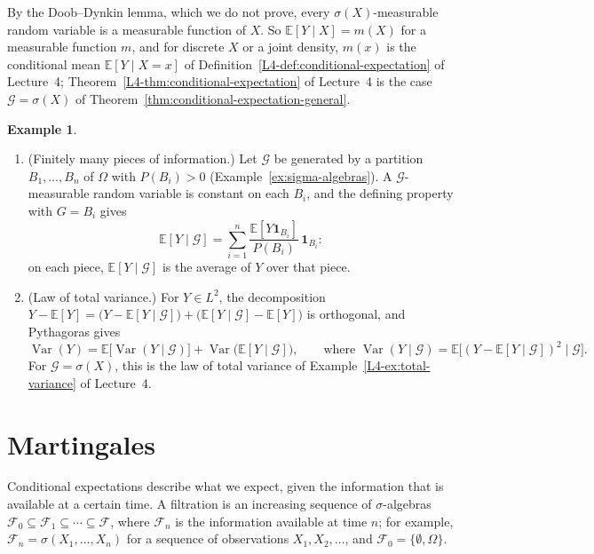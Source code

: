 \documentclass[11pt]{article}
\newcommand{\E}{\mathbb{E}}
\DeclareMathOperator{\Var}{Var}
\theoremstyle{definition}
\newtheorem{example}[definition]{Example}
\theoremstyle{plain}
\theoremstyle{remark}
\begin{document}
By the Doob--Dynkin lemma, which we do not prove, every $\sigma(X)$-measurable random variable is a measurable function of $X$. So $\E[Y \mid X] = m(X)$ for a measurable function $m$, and for discrete $X$ or a joint density, $m(x)$ is the conditional mean $\E[Y \mid X = x]$ of Definition~\ref{L4-def:conditional-expectation} of Lecture~4; Theorem~\ref{L4-thm:conditional-expectation} of Lecture~4 is the case $\mathcal{G} = \sigma(X)$ of Theorem~\ref{thm:conditional-expectation-general}.

\begin{example}\label{ex:conditional-partition}
    \begin{enumerate}
        \item (Finitely many pieces of information.) Let $\mathcal{G}$ be generated by a partition $B_1, \ldots, B_n$ of $\Omega$ with $P(B_i) > 0$ (Example~\ref{ex:sigma-algebras}). A $\mathcal{G}$-measurable random variable is constant on each $B_i$, and the defining property with $G = B_i$ gives
        \[\E[Y \mid \mathcal{G}] = \sum_{i=1}^n \frac{\E[Y\mathbf{1}_{B_i}]}{P(B_i)}\,\mathbf{1}_{B_i}:\]
        on each piece, $\E[Y \mid \mathcal{G}]$ is the average of $Y$ over that piece.
        \item (Law of total variance.) For $Y \in L^2$, the decomposition $Y - \E[Y] = \big(Y - \E[Y \mid \mathcal{G}]\big) + \big(\E[Y \mid \mathcal{G}] - \E[Y]\big)$ is orthogonal, and Pythagoras gives
        \[\Var(Y) = \E\big[\Var(Y \mid \mathcal{G})\big] + \Var\big(\E[Y \mid \mathcal{G}]\big), \qquad \text{where } \Var(Y \mid \mathcal{G}) = \E\big[(Y - \E[Y \mid \mathcal{G}])^2 \mid \mathcal{G}\big].\]
        For $\mathcal{G} = \sigma(X)$, this is the law of total variance of Example~\ref{L4-ex:total-variance} of Lecture~4.
    \end{enumerate}
\end{example}

\section{Martingales}\label{sec:martingales}

Conditional expectations describe what we expect, given the information that is available at a certain time. A filtration is an increasing sequence of $\sigma$-algebras $\mathcal{F}_0 \subseteq \mathcal{F}_1 \subseteq \cdots \subseteq \mathcal{F}$, where $\mathcal{F}_n$ is the information available at time $n$; for example, $\mathcal{F}_n = \sigma(X_1, \ldots, X_n)$ for a sequence of observations $X_1, X_2, \ldots$, and $\mathcal{F}_0 = \{\emptyset, \Omega\}$.
\end{document}
